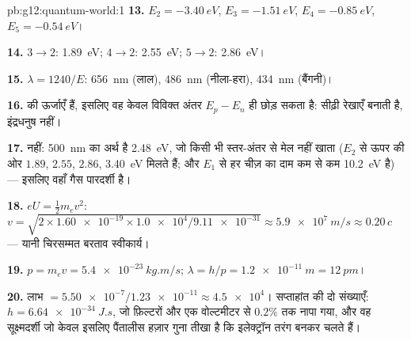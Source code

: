 \begin{solution}{pb:g12:quantum-world:1}
\textbf{13.} $E_2 = \qty{-3.40}{eV}$, $E_3 = \qty{-1.51}{eV}$, $E_4 = \qty{-0.85}{eV}$, $E_5 = \qty{-0.54}{eV}$।

\textbf{14.} $3 \to 2$: \qty{1.89}{eV}; $4 \to 2$: \qty{2.55}{eV}; $5 \to 2$: \qty{2.86}{eV}।

\textbf{15.} $\lambda = 1240/E$: \qty{656}{nm} (लाल), \qty{486}{nm} (नीला-हरा), \qty{434}{nm} (बैंगनी)।

\textbf{16.}  की ऊर्जाएँ  हैं, इसलिए वह केवल
विविक्त अंतर $E_p - E_n$ ही छोड़ सकता है: सीढ़ी रेखाएँ बनाती है, इंद्रधनुष नहीं।

\textbf{17.} नहीं: \qty{500}{nm} का अर्थ है \qty{2.48}{eV}, जो किसी भी स्तर-अंतर से मेल नहीं
खाता ($E_2$ से ऊपर की ओर $1.89$, $2.55$, $2.86$, \qty{3.40}{eV} मिलते हैं; और
$E_1$ से हर चीज़ का दाम कम से कम \qty{10.2}{eV} है) --- इसलिए वहाँ गैस पारदर्शी है।

\textbf{18.} $eU = \tfrac12 m_e v^2$: $v = \sqrt{2 \times
\num{1.60e-19} \times \num{1.0e4}/\num{9.11e-31}} \approx
\qty{5.9e7}{m/s} \approx 0.20\,c$ --- यानी चिरसम्मत बरताव स्वीकार्य।

\textbf{19.} $p = m_e v = \qty{5.4e-23}{kg.m/s}$; $\lambda = h/p = \qty{1.2e-11}{m} = \qty{12}{pm}$।

\textbf{20.} लाभ $= \num{5.50e-7}/\num{1.23e-11} \approx \num{4.5e4}$। सप्ताहांत की दो संख्याएँ: $h = \qty{6.64e-34}{J.s}$, जो फ़िल्टरों
और एक वोल्टमीटर से $0.2\%$ तक नापा गया, और वह सूक्ष्मदर्शी जो केवल इसलिए
पैंतालीस हज़ार गुना तीखा है कि इलेक्ट्रॉन तरंग बनकर चलते हैं।
\end{solution}
